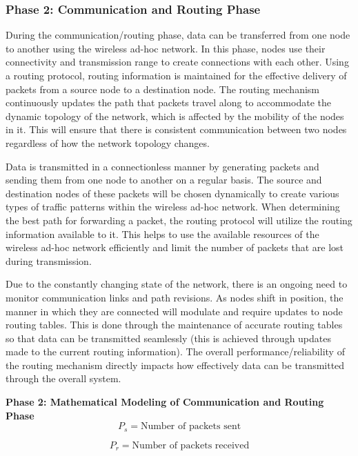 \documentclass[a4paper,fleqn]{cas-dc}
\numberwithin{equation}{section}
\begin{document}
\subsubsection{Phase 2: Communication and Routing Phase}

During the communication/routing phase, data can be transferred from one node to another using the wireless ad-hoc network. In this phase, nodes use their connectivity and transmission range to create connections with each other. Using a routing protocol, routing information is maintained for the effective delivery of packets from a source node to a destination node. The routing mechanism continuously updates the path that packets travel along to accommodate the dynamic topology of the network, which is affected by the mobility of the nodes in it. This will ensure that there is consistent communication between two nodes regardless of how the network topology changes.

Data is transmitted in a connectionless manner by generating packets and sending them from one node to another on a regular basis. The source and destination nodes of these packets will be chosen dynamically to create various types of traffic patterns within the wireless ad-hoc network. When determining the best path for forwarding a packet, the routing protocol will utilize the routing information available to it. This helps to use the available resources of the wireless ad-hoc network efficiently and limit the number of packets that are lost during transmission.

Due to the constantly changing state of the network, there is an ongoing need to monitor communication links and path revisions. As nodes shift in position, the manner in which they are connected will modulate and require updates to node routing tables. This is done through the maintenance of accurate routing tables so that data can be transmitted seamlessly (this is achieved through updates made to the current routing information). The overall performance/reliability of the routing mechanism directly impacts how effectively data can be transmitted through the overall system.

\textbf{Phase 2: Mathematical Modeling of Communication and Routing Phase}
\begin{equation}
P_s = \text{Number of packets sent}
\label{eq:cr1}
\end{equation}

\begin{equation}
P_r = \text{Number of packets received}
\label{eq:cr2}
\end{equation}
\end{document}
